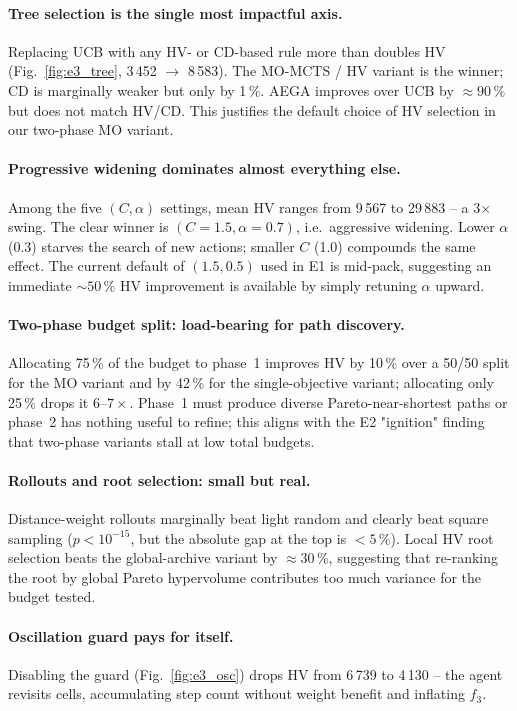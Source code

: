 \paragraph{Tree selection is the single most impactful axis.} Replacing UCB with any HV- or CD-based rule more than doubles HV (Fig.~\ref{fig:e3_tree}, 3\,452 $\to$ 8\,583). The MO-MCTS / HV variant is the winner; CD is marginally weaker but only by 1\,\%. AEGA improves over UCB by $\approx 90\,\%$ but does not match HV/CD. This justifies the default choice of HV selection in our two-phase MO variant.

\paragraph{Progressive widening dominates almost everything else.} Among the five $(C, \alpha)$ settings, mean HV ranges from 9\,567 to 29\,883 -- a 3$\times$ swing. The clear winner is $(C{=}1.5, \alpha{=}0.7)$, i.e.\ aggressive widening. Lower $\alpha$ (0.3) starves the search of new actions; smaller $C$ (1.0) compounds the same effect. The current default of $(1.5, 0.5)$ used in E1 is mid-pack, suggesting an immediate $\sim 50\,\%$ HV improvement is available by simply retuning $\alpha$ upward.

\paragraph{Two-phase budget split: load-bearing for path discovery.} Allocating 75\,\% of the budget to phase~1 improves HV by 10\,\% over a 50/50 split for the MO variant and by 42\,\% for the single-objective variant; allocating only 25\,\% drops it $6$--$7\times$. Phase~1 must produce diverse Pareto-near-shortest paths or phase~2 has nothing useful to refine; this aligns with the E2 "ignition" finding that two-phase variants stall at low total budgets.

\paragraph{Rollouts and root selection: small but real.} Distance-weight rollouts marginally beat light random and clearly beat square sampling ($p < 10^{-15}$, but the absolute gap at the top is $< 5\,\%$). Local HV root selection beats the global-archive variant by $\approx 30\,\%$, suggesting that re-ranking the root by global Pareto hypervolume contributes too much variance for the budget tested.

\paragraph{Oscillation guard pays for itself.} Disabling the guard (Fig.~\ref{fig:e3_osc}) drops HV from 6\,739 to 4\,130 -- the agent revisits cells, accumulating step count without weight benefit and inflating $f_3$.

